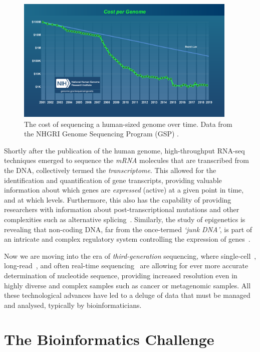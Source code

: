 \begin{justify}
\begin{figure}[h!]
    \centering
    \includegraphics[width=300pt]{chapters/images/introduction/sequencing_cost_moore.png}
    \caption{The cost of sequencing a human-sized genome over time. Data from the NHGRI Genome Sequencing Program (GSP) \cite{url-moore}.}\label{fig:seqcost}
\end{figure}

Shortly after the publication of the human genome, high-throughput RNA-seq techniques emerged to sequence the \emph{mRNA} molecules that are transcribed from the DNA, collectively termed the \emph{transcriptome}. This allowed for the identification and quantification of gene transcripts, providing valuable information about which genes are \emph{expressed} (active) at a given point in time, and at which levels. Furthermore, this also has the capability of providing researchers with information about post-transcriptional mutations and other complexities such as alternative splicing~\cite{wang2009rna}. Similarly, the study of epigenetics is revealing that non-coding DNA, far from the once-termed \textit{`junk DNA'}, is part of an intricate and complex regulatory system controlling the expression of genes~\cite{zuckerkandl2007combinatorial}.

Now we are moving into the era of \emph{third-generation} sequencing, where single-cell~\cite{gawad2016single}, long-read~\cite{koren2015one}, and often real-time sequencing~\cite{flusberg2010direct} are allowing for ever more accurate determination of nucleotide sequence, providing increased resolution even in highly diverse and complex samples such as cancer or metagenomic samples. All these technological advances have led to a deluge of data that must be managed and analysed, typically by bioinformaticians.


\section{The Bioinformatics Challenge}


\end{justify}
